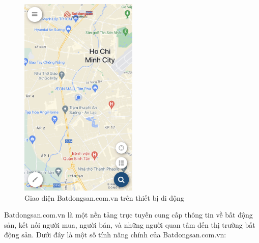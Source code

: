 \begin{figure}[H]
    \centering
    \includegraphics[width=0.5\textwidth]{Images/RelatedSystems/BatdongsanMobile.PNG}
    \caption{Giao diện Batdongsan.com.vn trên thiết bị di động}
\end{figure}
Batdongsan.com.vn là một nền tảng trực tuyến cung cấp thông tin về bất động sản, kết nối người mua, người bán, và những người quan tâm đến thị trường bất động sản. Dưới đây là một số tính năng chính của Batdongsan.com.vn:

